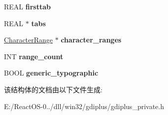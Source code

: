 \begin{DoxyCompactItemize}
\item 
\mbox{\label{struct_gp_string_format_a0648a7f9919aa50849f6527a79a4ea45}} 
R\+E\+AL {\bfseries firsttab}
\item 
\mbox{\label{struct_gp_string_format_a37b50503b816e3ec155f6b05daec23f2}} 
R\+E\+AL $\ast$ {\bfseries tabs}
\item 
\mbox{\label{struct_gp_string_format_a3ea50ef0ed8de3712c5f9bca83735ee5}} 
\hyperlink{struct_character_range}{Character\+Range} $\ast$ {\bfseries character\+\_\+ranges}
\item 
\mbox{\label{struct_gp_string_format_aa3ebea060dd1f2cc75584f434e868e4c}} 
I\+NT {\bfseries range\+\_\+count}
\item 
\mbox{\label{struct_gp_string_format_acc3427ad0d26747d3a1ebab1260cadaf}} 
B\+O\+OL {\bfseries generic\+\_\+typographic}
\end{DoxyCompactItemize}


该结构体的文档由以下文件生成\+:\begin{DoxyCompactItemize}
\item 
E\+:/\+React\+O\+S-\/0../dll/win32/gdiplus/gdiplus\+\_\+private.\+h\end{DoxyCompactItemize}
